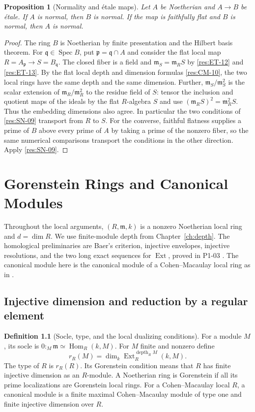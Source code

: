 \documentclass[11pt,oneside,openany]{book}
\newtheorem{proposition}[theorem]{Proposition}
\theoremstyle{definition}
\newtheorem{definition}[theorem]{Definition}
\theoremstyle{remark}
\begin{document}
\begin{proposition}[Normality and \'{e}tale maps]\label{res:SN-13}
Let $A$ be Noetherian and $A\to B$ be \'{e}tale. If $A$ is
normal, then $B$ is normal. If the map is faithfully flat and
$B$ is normal, then $A$ is normal.
\end{proposition}
\begin{proof}
The ring $B$ is Noetherian by finite presentation and the
Hilbert basis theorem. For $\mathfrak q\in\operatorname{Spec}B$,
put $\mathfrak p=\mathfrak q\cap A$ and consider the flat local
map $R=A_{\mathfrak p}\to S=B_{\mathfrak q}$. The closed fiber
is a field and $\mathfrak m_S=\mathfrak m_R S$ by
\ref{res:ET-12} and \ref{res:ET-13}. By the flat local
depth and dimension formulas \ref{res:CM-10}, the two local
rings have the same depth and the same dimension. Further,
$\mathfrak m_S/\mathfrak m_S^2$ is the scalar extension of
$\mathfrak m_R/\mathfrak m_R^2$ to the residue field of $S$:
tensor the inclusion and quotient maps of the ideals by
the flat $R$-algebra $S$ and use
$(\mathfrak m_RS)^2=\mathfrak m_R^2 S$.
Thus the embedding dimensions also agree. In particular the
two conditions of \ref{res:SN-09} transport from $R$ to $S$.
For the converse, faithful flatness supplies a prime of $B$
above every prime of $A$ by taking a prime of the nonzero
fiber, so the same numerical comparisons transport the
conditions in the other direction. Apply \ref{res:SN-09}.
\end{proof}
\chapter{Gorenstein Rings and Canonical Modules}\label{ch:gorenstein}

Throughout the local arguments, $(R,\mathfrak m,k)$ is a nonzero
Noetherian local ring and $d=\dim R$. We use finite-module depth
from Chapter~\ref{ch:depth}. The homological preliminaries are Baer's
criterion, injective envelopes, injective resolutions, and the two
long exact sequences for $\operatorname{Ext}$, proved in P1-03
\cite[Chapters 2, 10, and 11]{p103}. The canonical module here is
the canonical module of a Cohen--Macaulay local ring as in
\cite[Chapter 3]{brunsherzog}.

\section{Injective dimension and reduction by a regular element}

\begin{definition}[Socle, type, and the local dualizing conditions]
\label{res:GC-01}
For a module $M$, its socle is $0:_M\mathfrak m\simeq
\operatorname{Hom}_R(k,M)$. For $M$ finite and nonzero define
\[
 r_R(M)=\dim_k
 \operatorname{Ext}^{\operatorname{depth}_R M}_R(k,M).
\]
The type of $R$ is $r_R(R)$. Its Gorenstein condition means
that $R$ has finite injective dimension as an $R$-module.
A Noetherian ring is Gorenstein if all its prime localizations
are Gorenstein local rings. For a Cohen--Macaulay local $R$,
a canonical module is a finite maximal Cohen--Macaulay module
of type one and finite injective dimension over $R$.
\end{definition}
\end{document}
